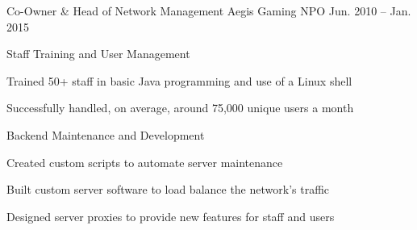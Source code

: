 \begin{cventries}
  \cventry%
    {Co-Owner \& Head of Network Management} %
    {Aegis Gaming NPO} %
    {} %
    {Jun. 2010 -- Jan. 2015} %
    {
      \begin{cvitems} %
        \item {Staff Training and User Management}
          \vspace{1.5mm}
          \begin{cvitems}
            \item {Trained 50+ staff in basic Java programming and use of a Linux shell}
            \item {Successfully handled, on average, around 75,000 unique users a month}
          \end{cvitems}
          \vspace{2.0mm}
        \item {Backend Maintenance and Development}
          \vspace{1.5mm}
          \begin{cvitems}
            \item {Created custom scripts to automate server maintenance}
            \item {Built custom server software to load balance the network's traffic}
            \item {Designed server proxies to provide new features for staff and users}
          \end{cvitems}
          \vspace{2.0mm}
      \end{cvitems}
    }

\end{cventries}
